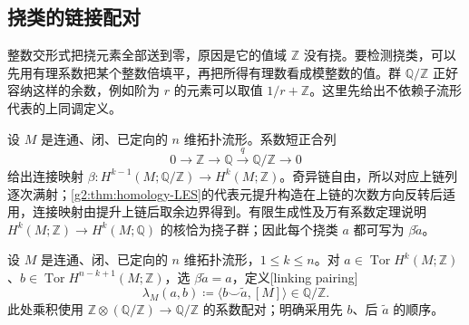 \subsection{挠类的链接配对}
\label{g2:subsec:0605:03}
整数交形式把挠元素全部送到零，原因是它的值域 \(\mathbb Z\) 没有挠。要检测挠类，可以先用有理系数把某个整数倍填平，再把所得有理数看成模整数的值。群 \(\mathbb Q/\mathbb Z\) 正好容纳这样的余数，例如阶为 \(r\) 的元素可以取值 \(1/r+\mathbb Z\)。这里先给出不依赖子流形代表的上同调定义。

\ProseParagraphBreak

设 \(M\) 是连通、闭、已定向的 \(n\) 维拓扑流形。系数短正合列
\[
	0\longrightarrow\mathbb Z\longrightarrow\mathbb Q\xrightarrow{q}\mathbb Q/\mathbb Z\longrightarrow0
\]
给出连接映射 \(\beta:H^{k-1}(M;\mathbb Q/\mathbb Z)\to H^k(M;\mathbb Z)\)。奇异链自由，所以对应上链列逐次满射；\cref{g2:thm:homology-LES}的代表元提升构造在上链的次数方向反转后适用，连接映射由提升上链后取余边界得到。有限生成性及万有系数定理说明 \(H^k(M;\mathbb Z)\to H^k(M;\mathbb Q)\) 的核恰为挠子群；因此每个挠类 \(a\) 都可写为 \(\beta\widetilde a\)。

\begin{definition}[挠类的链接配对]\label{g2:def:torsion-linking-pairing}
	设 \(M\) 是连通、闭、已定向的 \(n\) 维拓扑流形，\(1\leq k\leq n\)。对 \(a\in\operatorname{Tor}H^k(M;\mathbb Z)\)、\(b\in\operatorname{Tor}H^{n-k+1}(M;\mathbb Z)\)，选 \(\beta\widetilde a=a\)，定义[linking pairing]
	\begin{equation}\label{g2:eq:torsion-linking-pairing}
		\lambda_M(a,b)\coloneqq\langle b\smile\widetilde a,[M]\rangle\in\mathbb Q/\mathbb Z.
	\end{equation}
	此处乘积使用 \(\mathbb Z\otimes(\mathbb Q/\mathbb Z)\to\mathbb Q/\mathbb Z\) 的系数配对；明确采用先 \(b\)、后 \(\widetilde a\) 的顺序。
\end{definition}

